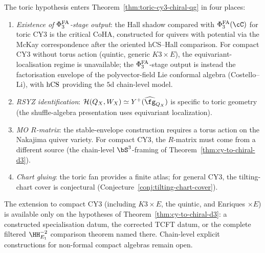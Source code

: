 \begin{remark}
\label{rem:compact-extension}
The toric hypothesis enters
Theorem~\ref{thm:toric-cy3-chiral-qg} in four places:
\begin{enumerate}[label=\textup{(\alph*)}]
 \item \emph{Existence of $\Phi^{\mathrm{FA}}_3$-stage output}:
 the Hall shadow compared with $\PhiFA_3(\cC)$ for toric CY3 is the
 critical CoHA, constructed for quivers with potential via the McKay
 correspondence after the oriented hCS--Hall comparison. For compact CY3 without torus action
 (quintic, generic $K3 \times E$), the equivariant-localisation
 regime is unavailable; the $\Phi^{\mathrm{FA}}_3$-stage output is instead
 the factorisation envelope of the polyvector-field Lie conformal
 algebra (Costello--Li), with $\mathrm{hCS}$ providing the $5$d chain-level
 model.
 \item \emph{RSYZ identification}:
 $\mathcal{H}(Q_X, W_X) \simeq Y^+(\widehat{\fg}_{Q_X})$
 is specific to toric geometry (the shuffle-algebra
 presentation uses equivariant localization).
 \item \emph{MO $R$-matrix}:
 the stable-envelope construction requires a torus action
 on the Nakajima quiver variety. For compact CY3, the
 $R$-matrix must come from a different source (the
 chain-level $\bS^3$-framing of
 Theorem~\ref{thm:cy-to-chiral-d3}).
 \item \emph{Chart gluing}:
 the toric fan provides a finite atlas; for general CY3,
 the tilting-chart cover is conjectural
 (Conjecture~\ref{conj:tilting-chart-cover}).
\end{enumerate}
The extension to compact CY3 (including $K3 \times E$,
the quintic, and Enriques $\times E$) is available only on the
hypotheses of Theorem~\ref{thm:cy-to-chiral-d3}: a constructed
specialisation datum, the corrected TCFT datum, or the complete
filtered $\HH^{-2}_{E_1}$ comparison theorem named there. Chain-level
explicit constructions for non-formal compact algebras remain open.
\end{remark}

